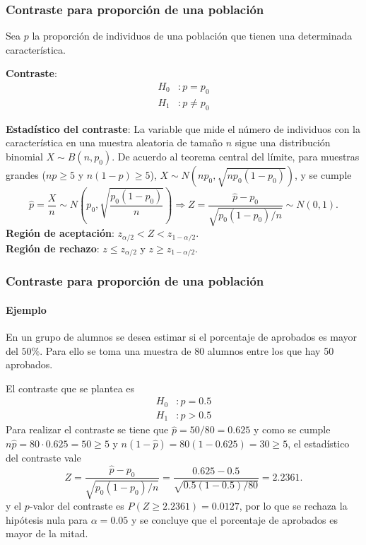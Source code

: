 \begin{frame}
\frametitle{Contraste para proporción de una población}
Sea $p$ la proporción de individuos de una población que tienen una determinada característica.

\textbf{Contraste}:
\begin{align*} 
H_0 &: p=p_0\\
H_1 &: p\neq p_0
\end{align*}

\textbf{Estadístico del contraste}: La variable que mide el número de individuos con la característica en una muestra
aleatoria de tamaño $n$ sigue una distribución binomial $X\sim B(n,p_0)$. De acuerdo al teorema central del límite, para
muestras grandes ($np\geq 5$ y $n(1-p)\geq 5$), $X\sim N(np_0,\sqrt{np_0(1-p_0)})$, y se cumple
\[
\hat{p}=\frac{X}{n} \sim N\left(p_0,\sqrt{\frac{p_0(1-p_0)}{n}}\right) \Rightarrow Z = \frac{\hat
p-p_0}{\sqrt{p_0(1-p_0)/n}}\sim N(0,1).
\]
\textbf{Región de aceptación}: $z_{\alpha/2}< Z < z_{1-\alpha/2}$.\\
\textbf{Región de rechazo}: $z\leq z_{\alpha/2}$ y $z\geq z_{1-\alpha/2}$.
\end{frame}


\begin{frame}
\frametitle{Contraste para proporción de una población}
\framesubtitle{Ejemplo}
En un grupo de alumnos se desea estimar si el porcentaje de aprobados es mayor del $50\%$.
Para ello se toma una muestra de 80 alumnos entre los que hay 50 aprobados.

El contraste que se plantea es
\begin{align*} 
H_0 &: p=0.5\\
H_1 &: p>0.5
\end{align*}
Para realizar el contraste se tiene que $\hat p= 50/80 = 0.625$ y como se cumple $n\hat p=80\cdot 0.625 = 50\geq 5$ y
$n(1-\hat p)=80(1-0.625)=30\geq 5$, el estadístico del contraste vale
\[
Z = \frac{\hat p-p_0}{\sqrt{p_0(1-p_0)/n}} = \frac{0.625-0.5}{\sqrt{0.5(1-0.5)/80}} = 2.2361.
\]
y el $p$-valor del contraste es $P(Z\geq 2.2361)=0.0127$, por lo que se rechaza la hipótesis nula para $\alpha=0.05$ y
se concluye que el porcentaje de aprobados es mayor de la mitad. 
\end{frame}



